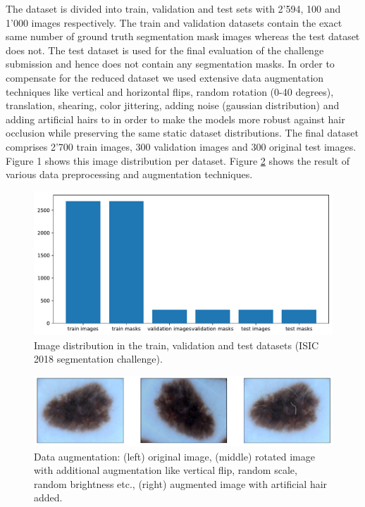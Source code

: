 \par
The dataset is divided into train, validation and test sets with 2’594, 100 and 1’000 images respectively. The train and validation datasets contain the exact same number of ground truth segmentation mask images whereas the test dataset does not. The test dataset is used for the final evaluation of the challenge submission and hence does not contain any segmentation masks. In order to compensate for the reduced dataset we used extensive data augmentation techniques like vertical and horizontal flips, random rotation (0-40 degrees), translation, shearing, color jittering, adding noise (gaussian distribution) and adding artificial hairs to in order to make the models more robust against hair occlusion while preserving the same static dataset distributions. The final dataset comprises 2’700 train images, 300 validation images and 300 original test images. Figure 1 shows this image distribution per dataset. Figure \ref{data_augmentation} shows the result of various data preprocessing and augmentation techniques.

\begin{figure}[ht]
\centering
\includegraphics[width=\columnwidth]{assets/datasets.pdf}
\caption[Datasets]
{Image distribution in the train, validation and test datasets (ISIC 2018 segmentation challenge).}
\label{datasets}
\end{figure}

\begin{figure}[ht]
\centering
\includegraphics[width=\columnwidth]{assets/data_augmentation.pdf}
\caption[Datasets]
{Data augmentation: (left) original image, (middle) rotated image with additional augmentation like vertical flip, random scale, random brightness etc., (right) augmented image with artificial hair added.}
\label{data_augmentation}
\end{figure}

